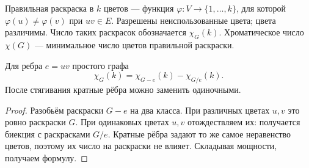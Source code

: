 \begin{definition}
Правильная раскраска в \(k\) цветов — функция \(\varphi:V\to\{1,\ldots,k\}\),
для которой \(\varphi(u)\ne\varphi(v)\) при \(uv\in E\).
Разрешены неиспользованные цвета; цвета различимы.
Число таких раскрасок обозначается \(\chi_G(k)\).
Хроматическое число \(\chi(G)\) — минимальное число цветов правильной раскраски.
\end{definition}
\begin{lemma}
Для ребра \(e=uv\) простого графа
\[
 \boxed{\chi_G(k)=\chi_{G-e}(k)-\chi_{G/e}(k).}
\]
После стягивания кратные рёбра можно заменить одиночными.
\end{lemma}
\begin{proof}
Разобьём раскраски \(G-e\) на два класса.
При различных цветах \(u,v\) это ровно раскраски \(G\).
При одинаковых цветах \(u,v\) отождествляем их: получается биекция
с раскрасками \(G/e\). Кратные рёбра задают то же самое неравенство цветов,
поэтому их число на раскраски не влияет. Складывая мощности, получаем формулу.
\end{proof}




